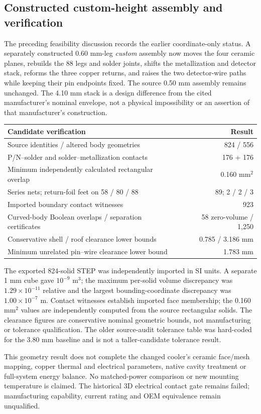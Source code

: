 \subsection{Constructed custom-height assembly and verification}
The preceding feasibility discussion records the earlier coordinate-only status. A separately constructed 0.60 mm-leg \emph{custom} assembly now moves the four ceramic planes, rebuilds the 88 legs and solder joints, shifts the metallization and detector stack, reforms the three copper returns, and raises the two detector-wire paths while keeping their pin endpoints fixed. The source 0.50 mm assembly remains unchanged. The 4.10 mm stack is a design difference from the cited manufacturer's nominal envelope, not a physical impossibility or an assertion of that manufacturer's construction.

\begin{center}\small\begin{tabular}{lr}\toprule
Candidate verification & Result \\ \midrule
Source identities / altered body geometries & 824 / 556 \\
P/N--solder and solder--metallization contacts & 176 + 176 \\
Minimum independently calculated rectangular overlap & 0.160 mm$^2$ \\
Series nets; return-foil feet on 58 / 80 / 88 & 89; 2 / 2 / 3 \\
Imported boundary contact witnesses & 923 \\
Curved-body Boolean overlaps / separation certificates & 58 zero-volume / 1,250 \\
Conservative shell / roof clearance lower bounds & 0.785 / 3.186 mm \\
Minimum unrelated pin--wire clearance lower bound & 1.783 mm \\
\bottomrule\end{tabular}\end{center}
The exported 824-solid STEP was independently imported in SI units. A separate 1 mm cube gave $10^{-9}$ m$^3$; the maximum per-solid volume discrepancy was $1.29\times10^{-11}$ relative and the largest bounding-coordinate discrepancy was $1.00\times10^{-7}$ m. Contact witnesses establish imported face membership; the 0.160 mm$^2$ values are independently computed from the source rectangular solids. The clearance figures are conservative nominal geometric bounds, not manufacturing or tolerance qualification. The older source-audit tolerance table was hard-coded for the 3.80 mm baseline and is not a taller-candidate tolerance result.

This geometry result does not complete the changed cooler's ceramic face/mesh mapping, copper thermal and electrical parameters, native cavity treatment or full-system energy balance. No matched-power comparison or new mounting temperature is claimed. The historical 3D electrical contact gate remains failed; manufacturing capability, current rating and OEM equivalence remain unqualified.
